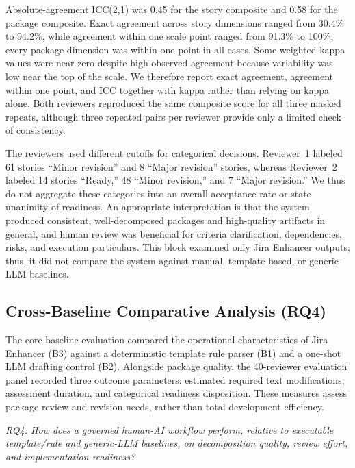 \documentclass[pdflatex,sn-basic]{sn-jnl}
\begin{document}
Absolute-agreement ICC(2,1) was 0.45 for the story composite and 0.58 for the package composite. Exact agreement across story dimensions ranged from 30.4\% to 94.2\%, while agreement within one scale point ranged from 91.3\% to 100\%; every package dimension was within one point in all cases. Some weighted kappa values were near zero despite high observed agreement because variability was low near the top of the scale. We therefore report exact agreement, agreement within one point, and ICC together with kappa rather than relying on kappa alone. Both reviewers reproduced the same composite score for all three masked repeats, although three repeated pairs per reviewer provide only a limited check of consistency.

The reviewers used different cutoffs for categorical decisions. Reviewer~1 labeled 61 stories ``Minor revision'' and 8 ``Major revision'' stories, whereas Reviewer~2 labeled 14 stories ``Ready,'' 48 ``Minor revision,'' and 7 ``Major revision.'' We thus do not aggregate these categories into an overall acceptance rate or state unanimity of readiness. An appropriate interpretation is that the system produced consistent, well-decomposed packages and high-quality artifacts in general, and human review was beneficial for criteria clarification, dependencies, risks, and execution particulars. This block examined only Jira Enhancer outputs; thus, it did not compare the system against manual, template-based, or generic-LLM baselines.

\subsection{Cross-Baseline Comparative Analysis (RQ4)}\label{sec:matched-comparison}
The core baseline evaluation compared the operational characteristics of Jira Enhancer (B3) against a deterministic template rule parser (B1) and a one-shot LLM drafting control (B2). Alongside package quality, the 40-reviewer evaluation panel recorded three outcome parameters: estimated required text modifications, assessment duration, and categorical readiness disposition. These measures assess package review and revision needs, rather than total development efficiency.


\noindent\textit{RQ4: How does a governed human-AI workflow perform, relative to executable template/rule and generic-LLM baselines, on decomposition quality, review effort, and implementation readiness?}\par
\end{document}
